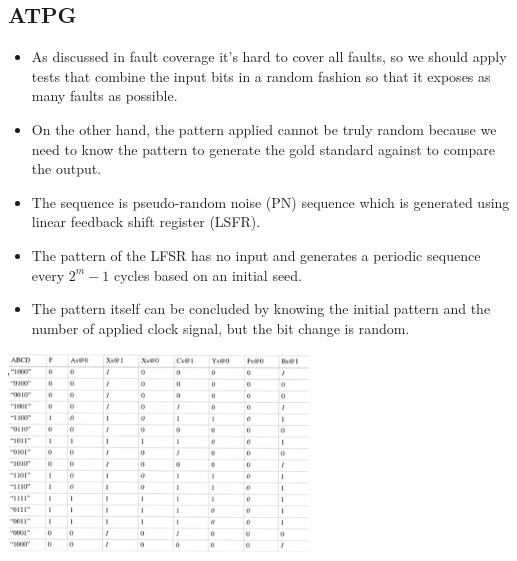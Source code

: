 \documentclass[11pt]{article}
\begin{document}
\subsection*{ATPG}
\begin{itemize}
    \item As discussed in fault coverage it's hard to cover all faults, so we should apply tests that combine the input bits in a random fashion so that it exposes as many faults as possible.
    \item On the other hand, the pattern applied cannot be truly random because we need to know the pattern to generate the gold standard against to compare the output.
    \item The sequence is pseudo-random noise (PN) sequence which is generated using linear feedback shift register (LSFR).
    \item The pattern of the LFSR has no input and generates a periodic sequence every $2^m - 1$ cycles based on an initial seed.
    \item The pattern itself can be concluded by knowing the initial pattern and the number of applied clock signal, but the bit change is random.
\end{itemize}

\begin{center}
    \includegraphics[width=0.6\textwidth]{8.png}
\end{center}
\end{document}
